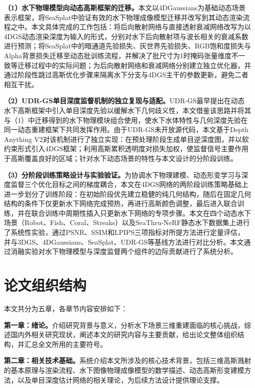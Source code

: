 \textbf{（1）水下物理模型向动态高斯框架的迁移。}本文以4DGaussians为基础动态场景表示框架，将SeaSplat中验证有效的水下物理成像模型迁移并改写到其动态渲染流程之中。本文具体完成的工作包括：将后向散射网络与直接透射衰减网络改写为以4DGS动态渲染深度为输入的形式，分别对水下后向散射项与波长相关的衰减系数进行预测；将SeaSplat中的暗通道先验损失、灰世界先验损失、RGB饱和度损失与Alpha背景损失迁移至动态批训练流程，并解决了批尺寸为1时掩码张量维度不一致等迁移过程中的实际问题；为后向散射网络和衰减网络分别建立独立优化器，并通过阶段性跳过高斯优化步骤来隔离水下分支与4DGS主干的参数更新，避免二者相互干扰。

\textbf{（2）UDR-GS单目深度监督机制的独立复现与适配。}UDR-GS最早提出在动态水下高斯框架中引入单目深度先验以缓解水下几何歧义性，本文借鉴该思路并将其与（1）中迁移得到的水下物理模块组合使用，使水下水体特性与几何深度先验在同一动态重建框架下共同发挥作用。由于UDR-GS未开放源代码，本文基于Depth Anything V2对该机制进行了独立实现：在预处理阶段生成单目逆深度图，并以软约束形式引入4DGS框架；利用高斯累积透明度对损失加权，使监督信号主要作用于高斯覆盖良好的区域；针对水下动态场景的特性与本文设计的分阶段训练。

\textbf{（3）分阶段训练策略设计与实验验证。}为协调水下物理建模、动态形变学习与深度监督三个优化目标之间的梯度耦合，本文在4DGS网络的两阶段训练策略基础上进一步划分了训练阶段：在初始阶段优先建立稳健的纯几何结构，随后在固定几何结构的条件下仅更新水下网络完成预热，再进行高斯颜色调整，最后进入联合训练，并在联合训练中周期性插入只更新水下网络的专项步骤。本文在四个动态水下场景（Robot、Fish、Coral、Streaks）以及SeaThru-NeRF静态水下数据集上进行了系统性实验，通过PSNR、SSIM和LPIPS三项指标对所提方法进行定量评估，并与3DGS、4DGaussians、SeaSplat、UDR-GS等基线方法进行对比分析。本文通过消融实验对水下物理模型与深度监督两个组件的边际贡献进行了系统分析。

\section{论文组织结构}

本文共分为五章，各章节内容安排如下：

\textbf{第一章：绪论。}介绍研究背景与意义，分析水下场景三维重建面临的核心挑战，综述国内外相关研究现状，阐述本文的研究内容与主要贡献，给出论文整体组织结构，并汇总全文所用的主要符号。

\textbf{第二章：相关技术基础。}系统介绍本文所涉及的核心技术背景，包括三维高斯溅射的基本原理与渲染流程、水下图像物理成像模型的数学描述、动态高斯形变建模方法，以及单目深度估计网络的相关理论，为后续方法设计提供理论支撑。

